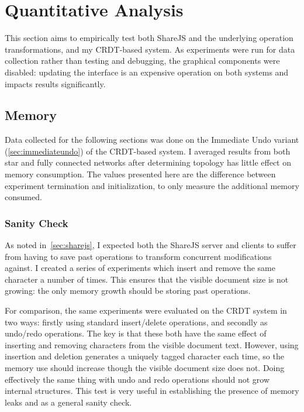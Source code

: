 \documentclass[12pt,a4paper,twoside,openright]{report}
\begin{document}
	
	
	
	\section{Quantitative Analysis} \label{sec:quanteval}
	
		This section aims to empirically test both ShareJS and the underlying operation transformations, and my CRDT-based system. As experiments were run for data collection rather than testing and debugging, the graphical components were disabled: updating the interface is an expensive operation on both systems and impacts results significantly.
		
		
			
		\subsection{Memory}
			Data collected for the following sections was done on the Immediate Undo variant (\cref{sec:immediateundo}) of the CRDT-based system. I averaged results from both star and fully connected networks after determining topology has little effect on memory consumption. The values presented here are the difference between experiment termination and initialization, to only measure the additional memory consumed.
		
			\subsubsection{Sanity Check} \label{sec:sanitycheck}
				As noted in~\cref{sec:sharejs}, I expected both the ShareJS server and clients to suffer from having to save past operations to transform concurrent modifications against. I created a series of experiments which insert and remove the same character a number of times. This ensures that the visible document size is not growing: the only memory growth should be storing past operations. 
				
				For comparison, the same experiments were evaluated on the CRDT system in two ways: firstly using standard insert/delete operations, and secondly as undo/redo operations. The key is that these both have the same effect of inserting and removing characters from the visible document text. However, using insertion and deletion generates a uniquely tagged character each time, so the memory use should increase though the visible document size does not. Doing effectively the same thing with undo and redo operations should not grow internal structures. This test is very useful in establishing the presence of memory leaks and as a general sanity check.
						
\end{document}
